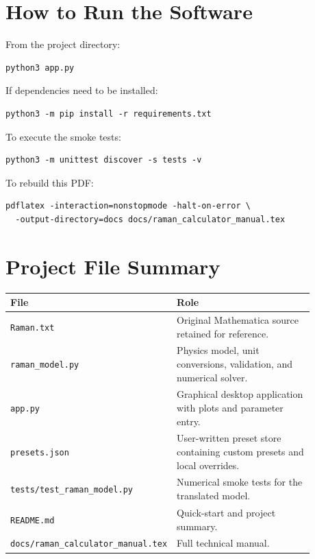 \documentclass[11pt,a4paper]{article}
\begin{document}
\section{How to Run the Software}

From the project directory:

\begin{verbatim}
python3 app.py
\end{verbatim}

If dependencies need to be installed:

\begin{verbatim}
python3 -m pip install -r requirements.txt
\end{verbatim}

To execute the smoke tests:

\begin{verbatim}
python3 -m unittest discover -s tests -v
\end{verbatim}

To rebuild this PDF:

\begin{verbatim}
pdflatex -interaction=nonstopmode -halt-on-error \
  -output-directory=docs docs/raman_calculator_manual.tex
\end{verbatim}

\section{Project File Summary}

\begin{center}
\begin{tabular}{>{\raggedright\arraybackslash}p{0.36\linewidth} >{\raggedright\arraybackslash}p{0.52\linewidth}}
\toprule
File & Role \\
\midrule
\texttt{Raman.txt} & Original Mathematica source retained for reference. \\
\texttt{raman\_model.py} & Physics model, unit conversions, validation, and numerical solver. \\
\texttt{app.py} & Graphical desktop application with plots and parameter entry. \\
\texttt{presets.json} & User-written preset store containing custom presets and local overrides. \\
\texttt{tests/test\_raman\_model.py} & Numerical smoke tests for the translated model. \\
\texttt{README.md} & Quick-start and project summary. \\
\texttt{docs/raman\_calculator\_manual.tex} & Full technical manual. \\
\bottomrule
\end{tabular}
\end{center}
\end{document}
